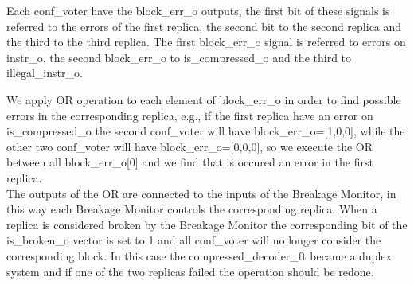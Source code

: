 {{{    		Each conf\_voter have the block\_err\_o outputs, the first bit of these signals is referred to the errors of the first replica, the second bit to the second replica and the third to the third replica. The first block\_err\_o signal is referred to errors on instr\_o, the second block\_err\_o to is\_compressed\_o and the third to illegal\_instr\_o. 
    		
            We apply OR operation to each element of block\_err\_o in order to find possible errors in the corresponding replica, e.g., if the first replica have an error on is\_compressed\_o the second conf\_voter will have block\_err\_o=[1,0,0], while the other two conf\_voter will have block\_err\_o=[0,0,0], so we execute the OR between all block\_err\_o[0] and we find that is occured an error in the first replica.\\
            
            The outputs of the OR are connected to the inputs of the Breakage Monitor, in this way each Breakage Monitor controls the corresponding replica. 
            When a replica is considered broken by the Breakage Monitor the corresponding bit of the is\_broken\_o vector is set to 1 and all conf\_voter will no longer consider the corresponding block. 
            In this case the compressed\_decoder\_ft became a duplex system and if one of the two replicas failed the operation should be redone.\\
            
}}}
